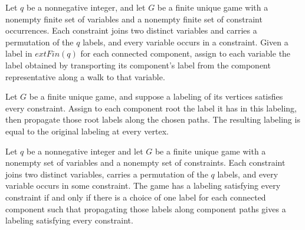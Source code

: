 \begin{definition}
\label{FABL.FiniteUniqueGame.propagatedLabel}
\leanok
{}
Let $q$ be a nonnegative integer, and let $G$ be a finite unique game with a nonempty
finite set of variables and a nonempty finite set of constraint occurrences. Each
constraint joins two distinct variables and carries a permutation of the $q$ labels, and
every variable occurs in a constraint. Given a label in $	ext{Fin}(q)$ for each
connected component, assign to each variable the label obtained by transporting its
component's label from the component representative along a walk to that variable.
\end{definition}

\begin{theorem}
\label{FABL.FiniteUniqueGame.propagatedLabel_eq_of_fullySatisfied}
\leanok
{}
Let $G$ be a finite unique game, and suppose a labeling of its vertices satisfies every
constraint. Assign to each component root the label it has in this labeling, then
propagate those root labels along the chosen paths. The resulting labeling is equal to
the original labeling at every vertex.
\end{theorem}

\begin{theorem}
\label{FABL.FiniteUniqueGame.satisfiable_iff_exists_component_labels}
\leanok
{}
Let $q$ be a nonnegative integer and let $G$ be a finite unique game with a nonempty set
of variables and a nonempty set of constraints. Each constraint joins two distinct
variables, carries a permutation of the $q$ labels, and every variable occurs in some
constraint. The game has a labeling satisfying every constraint if and only if there is
a choice of one label for each connected component such that propagating those labels
along component paths gives a labeling satisfying every constraint.
\end{theorem}

